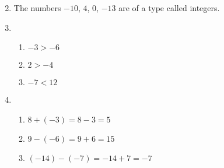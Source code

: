 \documentclass[fleqn]{article}
\begin{document}
\begin{enumerate}[label=\textbf{\arabic*.}]

\setcounter{enumi}{1}
\item The numbers $-10$, $4$, $0$, $-13$ are of a type called integers.

\item
\begin{enumerate}[label=\textbf{(\alph*)}]
\item $-3 > -6$
\item $2 > -4$
\item $-7 < 12$
\end{enumerate} 

\setcounter{enumi}{4}
\item
\begin{enumerate}[label=\textbf{(\alph*)}]
\item $8 + (-3) = 8 - 3 = 5$
\item $9 - (-6) = 9 + 6 = 15$
\item $(-14) - (-7) = -14 + 7 = -7$
\end{enumerate}

\end{enumerate}
\end{document}
